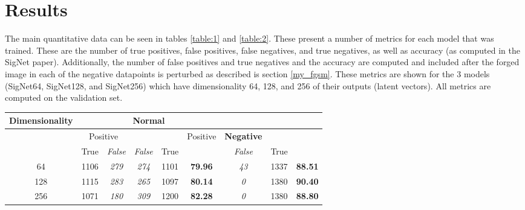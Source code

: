 \section{Results}\label{sec:results}

The main quantitative data can be seen in tables \ref{table:1} and \ref{table:2}.
These present a number of metrics for each model that was trained.
These are the number of true positives, false positives, false negatives, and true negatives, as well as accuracy (as computed in the SigNet paper\cite{sig_net}).
Additionally, the number of false positives and true negatives and the accuracy are computed and included after the forged image in each of the negative datapoints is perturbed as described is section \ref{my_fgsm}.
These metrics are shown for the 3 models (SigNet64, SigNet128, and SigNet256) which have dimensionality 64, 128, and 256 of their outputs (latent vectors).
All metrics are computed on the validation set.

\begin{table*}[t]
    \centering
    \begin{tabular}{|c | c >{\em}c | >{\em}c c | >{\bfseries}c | >{\em}c c >{\bfseries}c|}
        \hline
        \multirow{3}{*}{Dimensionality} & \multicolumn{5}{c|}{Normal} & \multicolumn{3}{c|}{Adversarial}\\
        \hline
        & \multicolumn{2}{c|}{Positive} & \multicolumn{2}{c|}{Negative} & \multirow{2}{*}{Accuracy} & Positive & Negative & \multirow{2}{*}{Accuracy}\\
        & True & False & False & True & & False & True & \\
        \hline
        64 & 1106 & 279 & 274 & 1101 & 79.96 & 43 & 1337 & 88.51\\
        128 & 1115 & 283 & 265 & 1097 & 80.14 & 0 & 1380 & 90.40\\
        256 & 1071 & 180 & 309 & 1200 & 82.28 & 0 & 1380 & 88.80\\
        \hline
    \end{tabular}
    \caption{Comparison of Accuracy using Latent Vector Sizes after 5 Epochs}
    \label{table:1}
\end{table*}

